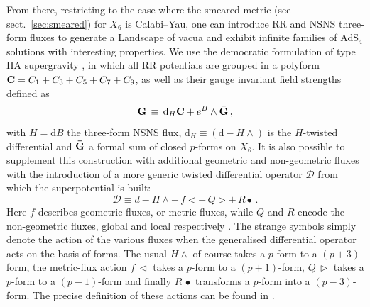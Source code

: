 \documentclass[11pt, a4paper]{article}
\newcommand{\dd}{\text{d}}
\def\be{\begin{equation}}
\def\ee{\end{equation}}
\begin{document}
From there, restricting to the case where the smeared metric (see sect.~\ref{sec:smeared}) for $X_6$ is Calabi--Yau, one can introduce RR and NSNS three-form fluxes to generate a Landscape of vacua and exhibit infinite families of AdS$_4$ solutions with interesting properties. We use the democratic formulation of type IIA supergravity \cite{Bergshoeff:2001pv}, in which all RR potentials are grouped in a polyform ${\bf C} = C_1 + C_3 + C_5 + C_7 + C_9$, as well as their gauge invariant field strengths defined as
%
\be
{\bf G} \,\equiv \, \dd_H{\bf C} + e^{B} \wedge {\bf \bar{G}} \, ,
\label{bfG}
\ee
%
with $H=\dd B$ the three-form NSNS flux, $\dd_H \equiv (\dd - H \wedge)$ is the $H$-twisted differential and ${\bf \bar{G}}$ a formal sum of closed $p$-forms on $X_6$. It is also possible to supplement this construction with additional geometric and non-geometric fluxes with the introduction of a more generic twisted differential operator $\mathcal{D}$ \cite{Shelton:2006fd} from which the superpotential is built:
\begin{equation}
\mathcal{D}\equiv d-H\wedge+\, f\triangleleft+\, Q\triangleright+\, R\bullet\, .
\end{equation}
%
Here $f$ describes geometric fluxes, or metric fluxes, while $Q$ and $R$ encode the non-geometric fluxes, global and local respectively \cite{Wecht:2007wu,Plauschinn:2018wbo}. The strange symbols simply denote the action of the various fluxes when the generalised differential operator acts on the basis of forms. The usual $H\wedge$ of course takes a $p$-form to a $(p+3)$-form, the metric-flux action $f\, \triangleleft$ takes a $p$-form to a $(p+1)$-form, $Q\, \triangleright$ takes a $p$-form to a $(p-1)$-form and  finally $R\, \bullet$ transforms a $p$-form into a $(p-3)$-form. The precise definition of these actions can be found in \cite{Marchesano:2020uqz}. 
\end{document}
